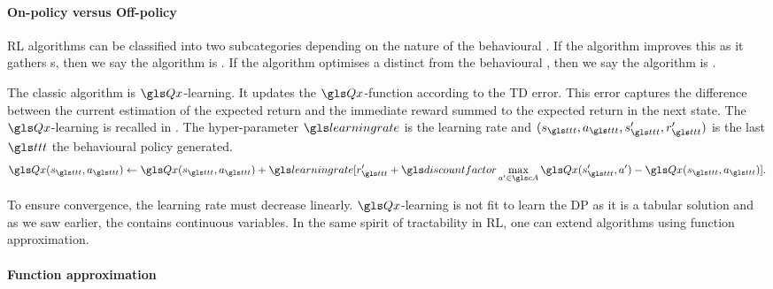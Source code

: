 \paragraph{On-policy versus Off-policy}

 \gls{RL} algorithms can be classified into two subcategories depending on the nature of the behavioural . If the algorithm improves this  as it gathers s, then we say the algorithm is . If the algorithm optimises a  distinct from the behavioural , then we say the algorithm is .

The classic  algorithm is $\Q$-learning. It updates the $\Q$-function according to the \gls{TD} error. This error captures the difference between the current estimation of the expected return and the immediate reward summed to the expected return in the next state. The $\Q$-learning is recalled in . The hyper-parameter ${\learningrate}$ is the learning rate and ${(s_{\indextransition},a_{\indextransition},s_{\indextransition}',r_{\indextransition}')}$ is the last  {${\indextransition}$} the behavioural policy generated.
\begin{equation}
    \Q({s_{{\indextransition}}}, {a_{{\indextransition}}}) \leftarrow \Q({s_{{\indextransition}}}, {a_{{\indextransition}}})+{\learningrate}[{r'_{{\indextransition}}}+\discountfactor \max _{a'\in\cA} \Q({s'_{{\indextransition}}}, a')-\Q({s_{{\indextransition}}}, {a_{{\indextransition}}})].
    \label{eq:q-learningg}
\end{equation}

To ensure convergence, the learning rate must decrease linearly. $\Q$-learning is not fit to learn the \gls{DP} as it is a tabular solution and as we saw earlier, the  contains continuous variables. In the same spirit of tractability in  \gls{RL}, one can extend  algorithms using function approximation.

\paragraph{Function approximation}

